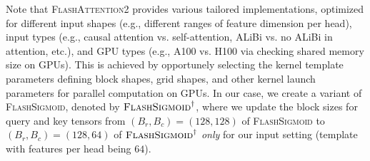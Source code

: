 \noindent Note that \textsc{FlashAttention2} provides various tailored implementations, optimized for different input shapes (e.g., different ranges of feature dimension per head), input types (e.g., causal attention vs. self-attention, ALiBi vs. no ALiBi in attention, etc.), and GPU types (e.g., A100 vs. H100 via checking shared memory size on GPUs). This is achieved by opportunely selecting the kernel template parameters defining block shapes, grid shapes, and other kernel launch parameters for parallel computation on GPUs. 
In our case, we create a variant of \textsc{FlashSigmoid}, denoted by $\textsc{FlashSigmoid}^{\dagger}$, where we update the block sizes for query and key tensors from $\left(B_r, B_c\right) = \left(128, 128\right)$ of \textsc{FlashSigmoid} to $\left(B_r, B_c\right) = \left(128, 64\right)$ of $\textsc{FlashSigmoid}^{\dagger}$ \emph{only} for our input setting (template with features per head being $64$). 
